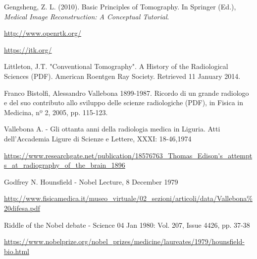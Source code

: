 \documentclass[a4paper,11pt, oneside]{article}
\begin{document}
\newpage
\begin{thebibliography}{1}
        Gengsheng, Z. L. (2010). Basic Principles of Tomography. In Springer (Ed.), \textit{Medical Image Reconstruction: A Conceptual Tutorial}.
        
        \url{http://www.openrtk.org/}
    
        \url{https://itk.org/}
    
        Littleton, J.T. "Conventional Tomography". A History of the Radiological Sciences (PDF). American Roentgen Ray Society. Retrieved 11 January 2014.
    
        Franco Bistolfi, Alessandro Vallebona 1899-1987. Ricordo di un grande radiologo e del suo contributo allo sviluppo delle scienze radiologiche (PDF), in Fisica in Medicina, nº 2, 2005, pp. 115-123.
        
        Vallebona A. - Gli ottanta anni della radiologia medica in Liguria. Atti dell’Accademia Ligure di Scienze e Lettere, XXXI: 18-46,1974
        
        \url{https://www.researchgate.net/publication/18576763_Thomas_Edison's_attempts_at_radiography_of_the_brain_1896}
        
        Godfrey N. Hounsfield - Nobel Lecture, 8 December 1979
        
        \url{http://www.fisicamedica.it/museo_virtuale/02_sezioni/articoli/data/Vallebona%20difesa.pdf}
        
        Riddle of the Nobel debate - Science 04 Jan 1980: Vol. 207, Issue 4426, pp. 37-38
        
        \url{https://www.nobelprize.org/nobel_prizes/medicine/laureates/1979/hounsfield-bio.html}
        
        
    \end{thebibliography}
\end{document}
